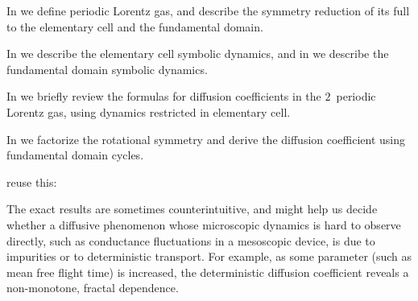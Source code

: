 In  we define periodic Lorentz gas, and describe the
symmetry reduction of its full {\statesp} to the elementary
cell and the fundamental domain.

In  we describe the elementary cell symbolic dynamics,
and in
 we describe the fundamental domain symbolic dynamics.




In 
we briefly review the formulas for diffusion
coefficients in the $2$\dmn\ periodic Lorentz gas, using dynamics
restricted in elementary cell.

In  we
factorize the rotational symmetry and derive the diffusion coefficient
using fundamental domain cycles.

     {
reuse this:

The exact results are sometimes counterintuitive, and might help us
decide whether a diffusive phenomenon whose microscopic dynamics is hard
to observe directly, such as conductance fluctuations in a mesoscopic
device, is due to impurities or to deterministic transport. For example,
as some parameter (such as mean free flight time) is increased, the
deterministic diffusion coefficient reveals a non-monotone, fractal
dependence.
    }
